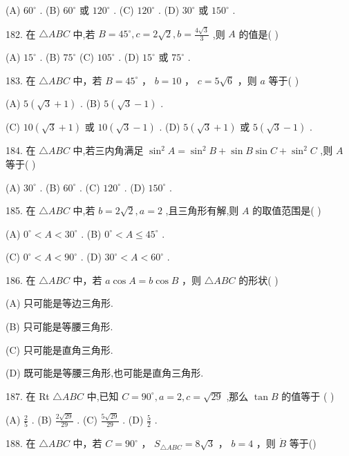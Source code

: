 \documentclass[10pt]{article}
\begin{document}
(A) \({60}^{ \circ  }\) . (B) \({60}^{ \circ  }\) 或 \({120}^{ \circ  }\) . (C) \({120}^{ \circ  }\) . (D) \({30}^{ \circ  }\) 或 \({150}^{ \circ  }\) .

182. 在 \(\bigtriangleup {ABC}\) 中,若 \(B = {45}^{ \circ  },c = 2\sqrt{2},b = \frac{4\sqrt{3}}{3}\) ,则 \(A\) 的值是( )

(A) \({15}^{ \circ  }\) . (B) \({75}^{ \circ  }\) (C) \({105}^{ \circ  }\) . (D) \({15}^{ \circ  }\) 或 \({75}^{ \circ  }\) .

183. 在 \(\bigtriangleup  {ABC}\) 中，若 \(B = {45}^{ \circ  }\) ， \(b = {{10}\text{ ， }c} = 5\sqrt{6}\) ，则 \(a\) 等于( )

(A) \(5\left( {\sqrt{3} + 1}\right)\) . (B) \(5\left( {\sqrt{3} - 1}\right)\) .

(C) \({10}\left( {\sqrt{3} + 1}\right)\) 或 \({10}\left( {\sqrt{3} - 1}\right)\) . (D) \(5\left( {\sqrt{3} + 1}\right)\) 或 \(5\left( {\sqrt{3} - 1}\right)\) .

184. 在 \(\bigtriangleup {ABC}\) 中,若三内角满足 \({\sin }^{2}A = {\sin }^{2}B + \sin B\sin C + {\sin }^{2}C\) ,则 \(A\) 等于( )

(A) \({30}^{ \circ  }\) . (B) \({60}^{ \circ  }\) . (C) \({120}^{ \circ  }\) . (D) \({150}^{ \circ  }\) .

185. 在 \(\bigtriangleup {ABC}\) 中,若 \(b = 2\sqrt{2},a = 2\) ,且三角形有解,则 \(A\) 的取值范围是( )

(A) \({0}^{ \circ  } < A < {30}^{ \circ  }\) . (B) \({0}^{ \circ  } < A \leq  {45}^{ \circ  }\) .

(C) \({0}^{ \circ  } < A < {90}^{ \circ  }\) . (D) \({30}^{ \circ  } < A < {60}^{ \circ  }\) .

186. 在 \(\bigtriangleup  {ABC}\) 中，若 \(a\cos A = b\cos B\) ，则 \(\bigtriangleup  {ABC}\) 的形状( )

(A) 只可能是等边三角形.

(B) 只可能是等腰三角形.

(C) 只可能是直角三角形.

(D) 既可能是等腰三角形,也可能是直角三角形.

187. 在 Rt \(\bigtriangleup {ABC}\) 中,已知 \(C = {90}^{ \circ  },a = 2,c = \sqrt{29}\) ,那么 \(\tan B\) 的值等于 ( )

(A) \(\frac{2}{5}\) . (B) \(\frac{2\sqrt{29}}{29}\) . (C) \(\frac{5\sqrt{29}}{29}\) . (D) \(\frac{5}{2}\) .

188. 在 \(\bigtriangleup  {ABC}\) 中，若 \({C = {90}^{ \circ  }\text{ ， }{S}_{\bigtriangleup {ABC}}} = {8\sqrt{3}}\) ， \(b = 4\) ，则 \(\dot{B}\) 等于()
\end{document}
